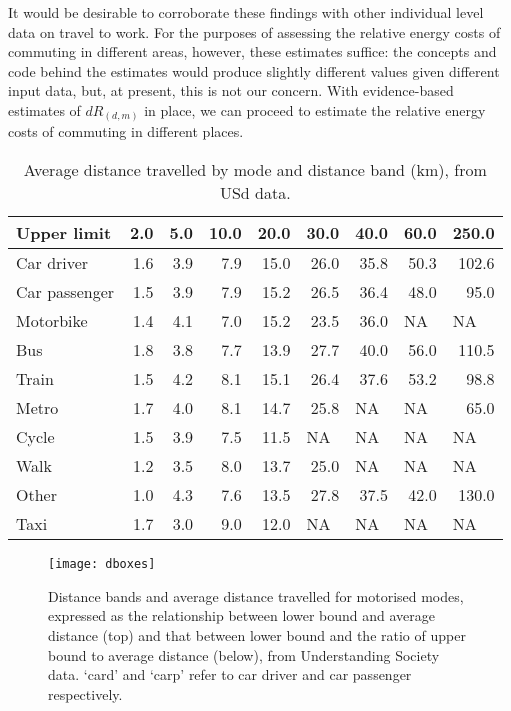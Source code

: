 It would be desirable to corroborate these findings with other individual level
data on travel to work. For the purposes of assessing the relative energy
costs of commuting in different areas, however, these estimates suffice:
the concepts and code behind the estimates would produce slightly different
values given different input data, but, at present, this is not our concern.
With evidence-based estimates of $dR_{(d,m)}$ in place,
we can proceed to estimate the relative energy costs of commuting in different
places. 

\begin{table}[htbp]
\caption[Average distance travelled by mode and distance band]
{Average distance travelled by mode and distance band (km),
from USd data.}\label{tdboxes}
\begin{center}
\begin{tabular}{lrrrrrrrr}
\toprule
Upper limit & 2.0 & 5.0 & 10.0 & 20.0 & 30.0 & 40.0 & 60.0 & 250.0 \\ \midrule
Car driver & 1.6 & 3.9 & 7.9 & 15.0 & 26.0 & 35.8 & 50.3 & 102.6 \\
Car passenger & 1.5 & 3.9 & 7.9 & 15.2 & 26.5 & 36.4 & 48.0 & 95.0 \\
Motorbike & 1.4 & 4.1 & 7.0 & 15.2 & 23.5 & 36.0 & \multicolumn{1}{l}{NA} & \multicolumn{1}{l}{NA} \\
Bus & 1.8 & 3.8 & 7.7 & 13.9 & 27.7 & 40.0 & 56.0 & 110.5 \\
Train & 1.5 & 4.2 & 8.1 & 15.1 & 26.4 & 37.6 & 53.2 & 98.8 \\
Metro & 1.7 & 4.0 & 8.1 & 14.7 & 25.8 & \multicolumn{1}{l}{NA} & \multicolumn{1}{l}{NA} & 65.0 \\
Cycle & 1.5 & 3.9 & 7.5 & 11.5 & \multicolumn{1}{l}{NA} & \multicolumn{1}{l}{NA} & \multicolumn{1}{l}{NA} & \multicolumn{1}{l}{NA} \\
Walk & 1.2 & 3.5 & 8.0 & 13.7 & 25.0 & \multicolumn{1}{l}{NA} & \multicolumn{1}{l}{NA} & \multicolumn{1}{l}{NA} \\
Other & 1.0 & 4.3 & 7.6 & 13.5 & 27.8 & 37.5 & 42.0 & 130.0 \\
Taxi & 1.7 & 3.0 & 9.0 & 12.0 & \multicolumn{1}{l}{NA} & \multicolumn{1}{l}{NA} & \multicolumn{1}{l}{NA} & \multicolumn{1}{l}{NA} \\
\bottomrule
\end{tabular}
\end{center}
\end{table}

\begin{figure}[htbp]
\begin{center}
    \texttt{[image: dboxes]}\end{center}
  \caption[Distance bands and average distance travelled for motorised modes]
  {Distance bands and average distance travelled for motorised modes, expressed
  as the relationship between lower bound and average distance (top)
  and that between lower bound and the ratio of upper bound to average distance
  (below), from Understanding Society data. `card' and `carp' refer to
car driver and car passenger respectively.} %
  \label{fdboxes}
\end{figure}

